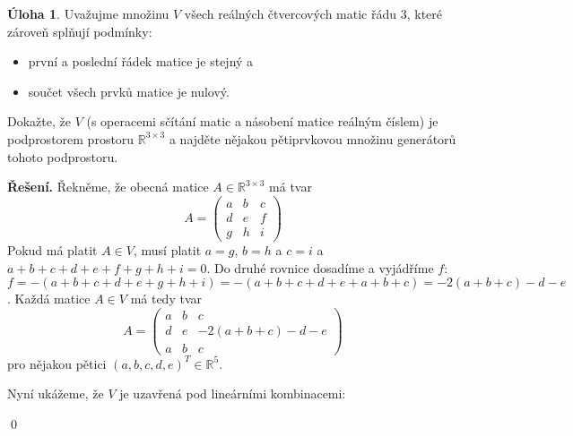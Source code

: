 \documentclass{article}
\theoremstyle{definition}
\newtheorem{uloha}{Úloha}
\theoremstyle{plain}
\newcommand{\R}{\mathbb{R}}
\newenvironment{reseni}{\noindent\textbf{Řešení.}\hspace{0.5em}}{\hfill\qed\medskip}
\begin{document}
\begin{uloha}
Uvažujme množinu $V$ všech reálných čtvercových matic řádu 3, které zároveň splňují podmínky:
\begin{itemize}
    \item první a poslední řádek matice je stejný a
    \item součet všech prvků matice je nulový.
\end{itemize}
Dokažte, že $V$ (s operacemi sčítání matic a násobení matice reálným číslem) je podprostorem prostoru $\mathbb{R}^{3 \times 3}$ a najděte nějakou pětiprvkovou množinu generátorů tohoto podprostoru.
\end{uloha}
\begin{reseni}
Řekněme, že obecná matice $A \in \R^{3\times 3}$ má tvar
\[
A = \begin{pmatrix}
a & b & c \\
d & e & f \\
g & h & i
\end{pmatrix}
\]
Pokud má platit $A \in V$, musí platit $a = g$, $b = h$ a $c = i$ a $a + b + c + d + e + f + g + h + i = 0$. Do druhé rovnice dosadíme a vyjádříme $f$:
\[
f = -(a + b + c + d + e + g + h + i) = -(a + b + c + d + e + a + b + c) = -2(a + b + c) - d - e
\]
. Každá matice $A \in V$ má tedy tvar
\[
A = \begin{pmatrix}
a & b & c \\
d & e & -2(a + b + c) - d - e \\
a & b & c
\end{pmatrix}
\]
pro nějakou pětici $(a, b, c, d, e)^T \in \R^5$.

Nyní ukážeme, že $V$ je uzavřená pod lineárními kombinacemi:


\end{reseni}
\end{document}
